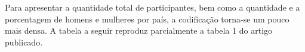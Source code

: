 \documentclass[
]{book}
\newenvironment{Shaded}{\begin{snugshade}}{\end{snugshade}}
\newcommand{\DataTypeTok}[1]{\textcolor[rgb]{0.13,0.29,0.53}{#1}}
\newcommand{\DecValTok}[1]{\textcolor[rgb]{0.00,0.00,0.81}{#1}}
\newcommand{\KeywordTok}[1]{\textcolor[rgb]{0.13,0.29,0.53}{\textbf{#1}}}
\newcommand{\NormalTok}[1]{#1}
\newcommand{\OperatorTok}[1]{\textcolor[rgb]{0.81,0.36,0.00}{\textbf{#1}}}
\newcommand{\StringTok}[1]{\textcolor[rgb]{0.31,0.60,0.02}{#1}}
\begin{document}
Para apresentar a quantidade total de participantes, bem como a
quantidade e a porcentagem de homens e mulheres por país, a codificação
torna-se um pouco mais densa. A tabela a seguir reproduz parcialmente a
tabela 1 do artigo publicado.

\begin{Shaded}
\end{Shaded}
\end{document}
